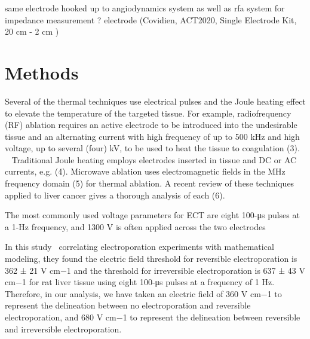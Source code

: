 \documentclass{article}
\begin{document}
 
same electrode hooked up to angiodynamics system as well as rfa system for
impedance measurement ? 
electrode (Covidien, ACT2020, Single Electrode Kit, 20 cm - 2 cm )





\section{Methods}
{\color{red}

Several of the thermal techniques
use electrical pulses and the Joule heating effect to elevate the
temperature of
the targeted tissue. For example, radiofrequency (RF) ablation requires an
active electrode to be introduced into the undesirable tissue and an
alternating
current with high frequency of up to 500 kHz and high voltage, up to several
(four) kV, to be used to heat the tissue to coagulation (3). ~\cite{Davalos2005}
Traditional Joule heating
employs electrodes inserted in tissue and DC or AC currents, e.g. (4).
Microwave ablation uses electromagnetic fields in the MHz frequency domain
(5) for thermal ablation. A recent review of these techniques applied to
liver
cancer gives a thorough analysis of each (6).




The most commonly
used voltage parameters for ECT are eight 100-μs
pulses at a 1-Hz frequency, and 1300 V is often applied
across the two electrodes


In this study~\cite{Miklavcic2000} correlating electroporation experiments with
mathematical modeling, they found the electric field threshold
for reversible electroporation is 362 ± 21 V cm−1 and
the threshold for irreversible electroporation is 637 ± 43 V
cm−1 for rat liver tissue using eight 100-μs pulses at a frequency
of 1 Hz. Therefore, in our analysis, we have taken
an electric field of 360 V cm−1 to represent the delineation
between no electroporation and reversible electroporation,
and 680 V cm−1 to represent the delineation between reversible
and irreversible electroporation.

}




\end{document}
